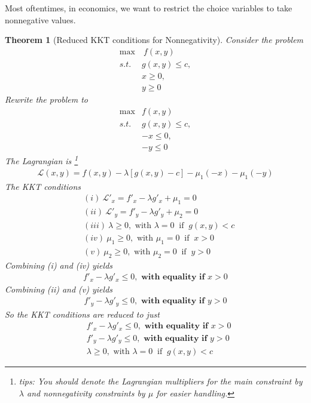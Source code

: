 \documentclass[11pt,a4paper]{book}
\newtheorem{theorem}{Theorem}[section]
\theoremstyle{definition}\newtheorem{definition}{Definition}
\theoremstyle{definition}\newtheorem{fact}{Fact}
\theoremstyle{definition}\newtheorem{remark}{Remark}
\theoremstyle{definition}\newtheorem{ex}{Ex.}
\theoremstyle{definition}\newtheorem{project}{Project}
\theoremstyle{definition}\newtheorem{problem}{Problem}
\theoremstyle{definition}\newtheorem{example}{Example}
\newenvironment{ftheorem}
{\begin{mdframed}\begin{theorem}}
		{\end{theorem}\end{mdframed}}
\numberwithin{theorem}{section}
\numberwithin{corollary}{chapter}
\numberwithin{assumption}{chapter}
\numberwithin{definition}{chapter}
\numberwithin{prop}{chapter}
\numberwithin{notation}{chapter}
\numberwithin{problem}{chapter}
\numberwithin{example}{chapter}
\numberwithin{fact}{chapter}
\numberwithin{ex}{chapter}
\begin{document}
	Most oftentimes, in economics, we want to restrict the choice variables to take nonnegative values.
	
	\begin{ftheorem}[Reduced KKT conditions for Nonnegativity]
			Consider the problem
		\begin{align*}
			\max &\ f(x,y)                \\
			s.t. \ & g(x,y) \leq c,                 \\
			& x \geq 0,      \\
			& y \geq 0       
		\end{align*}
		Rewrite the problem to
		\begin{align*}
			\max &f(x,y)                 \\
			s.t. & g(x,y) \leq c,                 \\
			& -x \leq 0,     \\
			& -y \leq 0      
		\end{align*}
		The Lagrangian is \footnote{tips: You should denote the Lagrangian multipliers for the main constraint by $\lambda$ and nonnegativity constraints by $\mu$ for easier handling.}
		\begin{align*}
			\mathcal{L} (x,y) = f(x,y) - \lambda [ g(x,y) - c] - \mu_1 (-x) - \mu_1 (-y) 
		\end{align*}
		The KKT conditions
		\begin{align*}
			& (i) \ \mathcal{L}'_x = f'_x - \lambda g'_x + \mu_1 = 0                       \\
			& (ii) \ \mathcal{L}'_y = f'_y - \lambda g'_y + \mu_2 = 0                      \\
			& (iii) \ \lambda \geq 0, \text{ with } \lambda = 0 \ \text{ if } \ g(x,y) < c \\
			& (iv) \ \mu_1 \geq 0, \text{ with } \mu_1 = 0 \ \text{ if } \ x > 0           \\
			& (v) \ \mu_2 \geq 0, \text{ with } \mu_2 = 0 \ \text{ if } \ y > 0            
		\end{align*}
		Combining (i) and (iv) yields
		\begin{align*}
			f'_x - \lambda g'_x \leq 0, \textbf{ with equality if $x>0$} 
		\end{align*} 
		Combining (ii) and (v) yields
		\begin{align*}
			f'_y - \lambda g'_y \leq 0, \textbf{ with equality if $y>0$} 
		\end{align*} 
		So the KKT conditions are reduced to just
		\begin{align*}
			& f'_x - \lambda g'_x \leq 0, \textbf{ with equality if $x>0$}         \\
			& f'_y - \lambda g'_y \leq 0, \textbf{ with equality if $y>0$}         \\
			& \lambda \geq 0, \text{ with } \lambda = 0 \ \text{ if } \ g(x,y) < c 
		\end{align*}
		
	\end{ftheorem}
	
\end{document}
